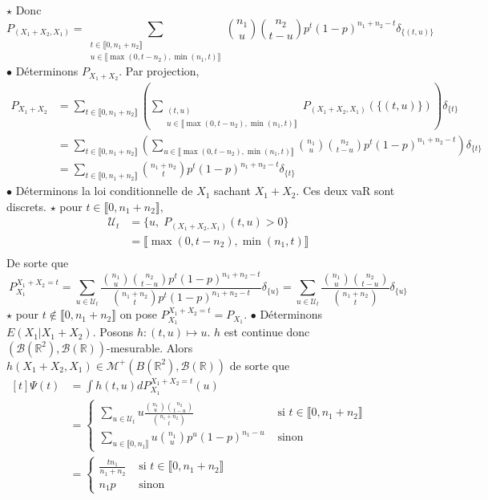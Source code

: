 \documentclass{report}
\begin{document}
$\star$ Donc $$P_{(X_1+X_2,X_1)} = \sum_{\substack{t\in \llbracket 0,n_1+n_2\rrbracket\\ u\in\llbracket \max(0,t-n_2),\min(n_1,t)\rrbracket }}\binom{n_1}{u}\binom{n_2}{t-u}p^t (1-p)^{n_1+n_2-t}\delta_{\{(t,u)\}}$$
$\bullet$ Déterminons $P_{X_1+X_2}$.\newline
Par projection, $$\begin{aligned}
P_{X_1+X_2} &= \sum_{t\in \llbracket 0,n_1+n_2\rrbracket} \left(\sum_{\substack{(t,u) \\u\in\llbracket \max(0,t-n_2),\min(n_1,t)\rrbracket}} P_{(X_1+X_2,X_1)}(\{(t,u)\})  \right) \delta_{\{t\}} \\
&= \sum_{t\in \llbracket 0,n_1+n_2\rrbracket} \left( \sum_{u\in\llbracket \max(0,t-n_2),\min(n_1,t)\rrbracket} \binom{n_1}{u}\binom{n_2}{t-u}p^t (1-p)^{n_1+n_2-t} \right) \delta_{\{t\}} \\
&= \sum_{t\in \llbracket 0,n_1+n_2\rrbracket}  \binom{n_1+n_2}{t}p^t (1-p)^{n_1+n_2-t} \delta_{\{t\}} 
\end{aligned}$$
$\bullet$ Déterminons la loi conditionnelle de $X_1$ sachant $X_1+X_2$. Ces deux vaR sont discrets.\newline
$\star$ pour $t\in\llbracket 0,n_1+n_2\rrbracket$, $$\begin{aligned}\mathcal U_t &=\{u,\; P_{(X_1+X_2,X_1)}(t,u)>0\}\\
&= \llbracket \max(0,t-n_2),\min(n_1,t)\rrbracket\\
 \end{aligned} $$
De sorte que $$P_{X_1}^{X_1+X_2=t} = \sum_{u\in \mathcal U_t} \frac{\binom{n_1}{u}\binom{n_2}{t-u}p^t (1-p)^{n_1+n_2-t}}{\binom{n_1+n_2}{t}p^t (1-p)^{n_1+n_2-t}}\delta_{\{u\}}=\sum_{u\in \mathcal U_t} \frac{\binom{n_1}{u}\binom{n_2}{t-u}}{\binom{n_1+n_2}{t}}\delta_{\{u\}}$$
$\star$ pour $t\notin\llbracket 0,n_1+n_2\rrbracket$ on pose $P_{X_1}^{X_1+X_2=t} = P_{X_1}$.\newline
\newline
$\bullet$ Déterminons $E(X_1|X_1+X_2)$.\newline
Posons $h:(t,u)\mapsto u$. $h$ est continue donc $(\mathcal B(\mathbb R^2),\mathcal B(\mathbb R))$-mesurable. Alors $h(X_1+X_2,X_1)\in \mathcal M^+(B(\mathbb R^2),\mathcal B(\mathbb R))$ de sorte que \newline
 $\begin{aligned}[t] \Psi(t)&=\int h(t,u)dP_{X_1}^{X_1+X_2=t}(u) \\
&= \begin{cases}
\sum_{u\in \mathcal U_t} u\frac{\binom{n_1}{u}\binom{n_2}{t-u}}{\binom{n_1+n_2}{t}} & \text{ si } t\in \llbracket 0,n_1+n_2\rrbracket \\
\sum_{u\in \llbracket 0,n_1 \rrbracket} u\binom{n_1}{u}p^u(1-p)^{n_1-u} &\text{ sinon}
\end{cases}\\
&= \begin{cases}
\frac{tn_1}{n_1+n_2} & \text{ si } t\in \llbracket 0,n_1+n_2\rrbracket \\
n_1p & \text{ sinon }
\end{cases}
\end{aligned}$\newline
\end{document}
